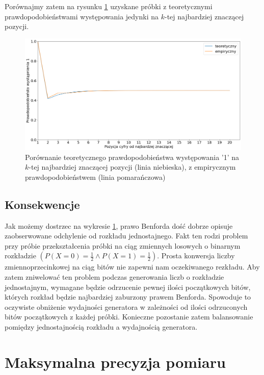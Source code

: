 Porównajmy zatem na rysunku \ref{fig:benford_in_real} uzyskane próbki z teoretycznymi prawdopodobieństwami występowania jedynki na $k$-tej najbardziej znaczącej pozycji.
\begin{figure}[!htp]
    \centering
    \includegraphics[width=15cm]{benford_comp}
    \caption{Porównanie teoretycznego prawdopodobieństwa występowania '1' na $k$-tej najbardziej znaczącej pozycji (linia niebieska), z empirycznym prawdopodobieństwem (linia pomarańczowa) }
    \label{fig:benford_in_real}
\end{figure}
\subsection{Konsekwencje}
Jak możemy dostrzec na wykresie \ref{fig:benford_in_real}, prawo Benforda dość dobrze opisuje zaobserwowane odchylenie od rozkładu jednostajnego.
Fakt ten rodzi problem przy próbie przekształcenia próbki na ciąg zmiennych losowych o binarnym rozkładzie $(P(X = 0) = \frac{1}{2} \land P(X = 1) = \frac{1}{2})$. Prosta konwersja liczby zmiennoprzecinkowej na ciąg bitów nie zapewni nam oczekiwanego rezkładu. Aby zatem zniwelować ten problem podczas generowania liczb o rozkładzie jednostajnym, wymagane będzie odrzucenie pewnej ilości początkowych bitów, których rozkład będzie najbardziej zaburzony prawem Benforda. Spowoduje to oczywiste obniżenie wydajności generatora w zależności od ilości odrzuconych bitów początkowych z każdej próbki. Konieczne pozostanie zatem balansowanie pomiędzy jednostajnością rozkładu a wydajnością generatora. 
\section{Maksymalna precyzja pomiaru}
